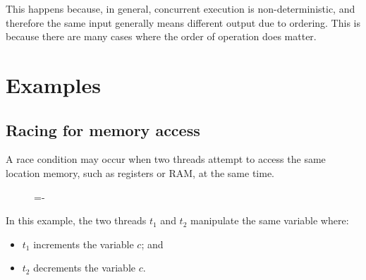 \documentclass[a4paper]{systems-software}
\begin{document}
This happens because, in general, concurrent execution is non-deterministic, and therefore the same input generally means different output due to ordering. This is because there are many cases where the order of operation does matter.


\section*{Examples}

\subsection*{Racing for memory access}

A race condition may occur when two threads attempt to access the same location memory, such as registers or RAM, at the same time.

\begin{figure}[H]
  \lineskip=-\fboxrule
\end{figure}

In this example, the two threads $t_{1}$ and $t_{2}$ manipulate the same variable where:
\begin{itemize}
	\item $t_{1}$ increments the variable $c$; and
	\item $t_{2}$ decrements the variable $c$.
\end{itemize}
\end{document}
